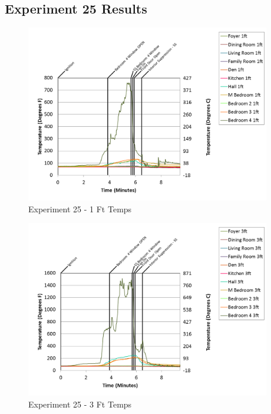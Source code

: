 \documentclass{article}
\begin{document}
\begin{appendices}
\clearpage

\clearpage
\clearpage		\large
\subsection{Experiment 25 Results} \label{App:Exp25Results} 

\begin{figure}[h!]
	\centering
	\includegraphics[height=3.05in]{0_Images/Results_Charts/Exp_25_Charts/1FtTemps.png}
	\caption{Experiment 25 - 1 Ft Temps}
\end{figure}


\begin{figure}[h!]
	\centering
	\includegraphics[height=3.05in]{0_Images/Results_Charts/Exp_25_Charts/3FtTemps.png}
	\caption{Experiment 25 - 3 Ft Temps}
\end{figure}

\clearpage


\end{appendices}
\end{document}
